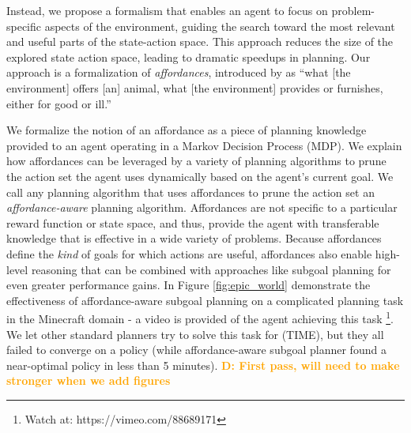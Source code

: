 \documentclass[]{article}
\newcommand{\dnote}[1]{\textcolor{Orange}{\textbf{D: #1}}}
\begin{document}
Instead, we propose a formalism that enables an agent to focus on
problem-specific aspects of the environment, guiding the search toward
the most relevant and useful parts of the state-action space.  This
approach reduces the size of the explored state action space, leading
to dramatic speedups in planning.  Our approach is a formalization of
{\em affordances}, introduced by \citet{gibson77} as ``what [the
  environment] offers [an] animal, what [the environment] provides or
furnishes, either for good or ill.''
      
      We formalize the notion of an affordance as a piece of planning
      knowledge provided to an agent operating in a Markov Decision
      Process (MDP). We explain how affordances can be leveraged by a
      variety of planning algorithms to prune the action set the agent
      uses dynamically based on the agent's current goal.  We call any
      planning algorithm that uses affordances to prune the action set
      an {\it affordance-aware} planning algorithm.  Affordances are
      not specific to a particular reward function or state space, and thus,
      provide the agent with transferable knowledge that is effective
      in a wide variety of problems. Because affordances
      define the {\em kind} of goals for which actions are useful,
      affordances also enable high-level reasoning that can
      be combined with approaches like subgoal planning for even
      greater performance gains. In Figure \ref{fig:epic_world} demonstrate the effectiveness of
      affordance-aware subgoal planning on a complicated planning task
      in the Minecraft domain - a video is provided of the agent achieving this task \footnote{Watch at: https://vimeo.com/88689171}.
      We let other standard planners try to solve this task for (TIME), but they all failed
      to converge on a policy (while affordance-aware subgoal planner found a near-optimal
      policy in less than 5 minutes). \dnote{First pass, will need to make stronger when we add figures}



\end{document}
